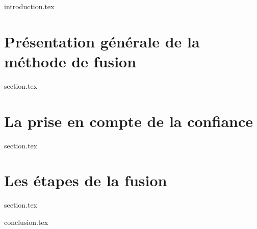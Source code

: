 
\chaptertoc{}

\label{chap:08-int}
{introduction.tex}

\section{Présentation générale de la méthode de fusion}
\label{chap:08-sec1}
{section.tex}

\section{La prise en compte de la confiance}
\label{chap:08-sec2}
{section.tex}

\section{Les étapes de la fusion}
\label{chap:08-sec3}
{section.tex}

\label{chap:08-cnc}
{conclusion.tex}

